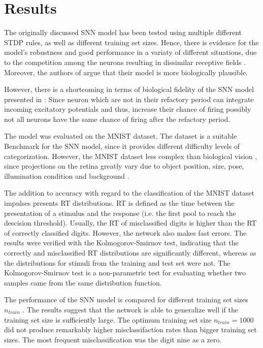 \section{Results}
\label{sec:result}

The originally discussed \ac{SNN} model has been tested using multiple different \ac{STDP} rules, as well as different training set sizes. 
Hence, there is evidence for the model's robustness and good performance in a variaty of different situations, 
due to the competition among the neurons resulting in dissimilar receptive fields \cite{SNN}.
Moreover, the authors of \cite{SNN} argue that their model is more biologically plausible.

However, there is a shortcoming in terms of biological fidelity of the \ac{SNN} model presented in \cite{SNN}:
Since neuron which are not in their refactory period can integrate incoming excitatory potentials and thus, 
increase their chance of firing possibly not all neurons have the same chance of firing after the refactory period.

The \cite{STDP_like} model was evaluated on the MNIST dataset.
The dataset is a suitable Benchmark for the \ac{SNN} model, 
since it provides different difficulty levels of categorization.
However, the MNIST dataset less complex than biological vision \cite{STDP_like}, 
since projections on the retina greatly vary due to object position, size, pose, illumination condition and background \cite{multi_scale_STDP}.

The addition to accuracy with regard to the classification of the MNIST dataset impulses \cite{STDP_like} presents \ac{RT} distributions.
\ac{RT} is defined as the time between the presentation of a stimulus and the response (i.e. the first pool to reach the descision threshold).
Usually, the \ac{RT} of misclassified digits is higher than the \ac{RT} of correctly classified digits.
However, the network also makes fast errors.
The results were verified with the Kolmogorov-Smirnov test, 
indicating that the correctly and misclassified \ac{RT} distributions are significantly different, 
whereas as the distributions for stimuli from the training and test set were not.
The Kolmogorov-Smirnov test \cite{Kolmogorov_Smirnov} is a non-parametric test for evaluating whether two samples came from the same distribution function.

The performance of the \ac{SNN} model is compared for different training set sizes $n_{train}$ \cite{STDP_like}.
The results suggest that the network is able to generalize well if the training set size is sufficiently large.
The optimum training set size $n_{train} = 1000$ did not produce remarkably higher misclassifaction rates than bigger training set sizes.
The most frequent misclassification was the digit nine as a zero.


